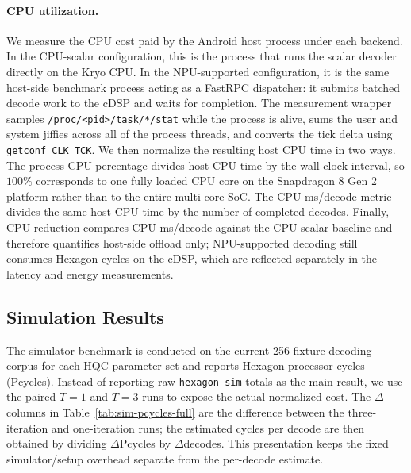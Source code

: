 \paragraph{CPU utilization.}
We measure the CPU cost paid by the Android host process under each backend. In
the CPU-scalar configuration, this is the process that runs the scalar decoder
directly on the Kryo CPU. In the NPU-supported configuration, it is the same
host-side benchmark process acting as a FastRPC dispatcher: it submits batched
decode work to the cDSP and waits for completion. The measurement wrapper
samples \texttt{/proc/<pid>/task/*/stat} while the process is alive, sums the
user and system jiffies across all of the process threads, and converts the
tick delta using \texttt{getconf CLK\_TCK}. We then normalize the resulting host
CPU time in two ways. The process CPU percentage divides host CPU time by the
wall-clock interval, so \(100\%\) corresponds to one fully loaded CPU core on
the Snapdragon 8 Gen 2 platform rather than to the entire multi-core SoC. The
CPU ms/decode metric divides the same host CPU time by the number of completed
decodes. Finally, CPU reduction compares CPU ms/decode against the CPU-scalar
baseline and therefore quantifies host-side offload only; NPU-supported decoding
still consumes Hexagon cycles on the cDSP, which are reflected separately in the
latency and energy measurements.


\subsection{Simulation Results}

The simulator benchmark is conducted on the current 256-fixture decoding corpus
for each HQC parameter set and reports Hexagon processor cycles (Pcycles).
Instead of reporting raw \texttt{hexagon-sim} totals as the main result, we use
the paired \(T=1\) and \(T=3\) runs to expose the actual normalized cost. The
\(\Delta\) columns in Table~\ref{tab:sim-pcycles-full} are the difference between
the three-iteration and one-iteration runs; the estimated cycles per decode are
then obtained by dividing \(\Delta\)Pcycles by \(\Delta\)decodes. This presentation
keeps the fixed simulator/setup overhead separate from the per-decode estimate.

